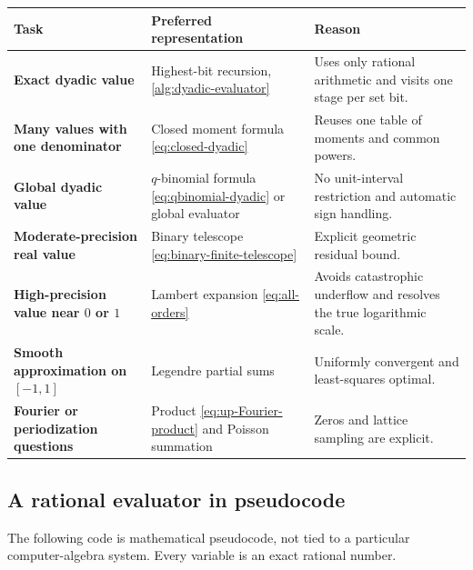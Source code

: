 \documentclass[11pt]{article}
\numberwithin{equation}{section}
\theoremstyle{definition}
\theoremstyle{remark}
\begin{document}
\begin{center}
\begin{tabularx}{\textwidth}{>{\bfseries}p{}X X}
\toprule
Task & Preferred representation & Reason\\
\midrule
Exact dyadic value & Highest-bit recursion, \cref{alg:dyadic-evaluator} &
Uses only rational arithmetic and visits one stage per set bit.\\
Many values with one denominator & Closed moment formula
\eqref{eq:closed-dyadic} & Reuses one table of moments and common powers.\\
Global dyadic value & $q$-binomial formula \eqref{eq:qbinomial-dyadic} or
global evaluator & No unit-interval restriction and automatic sign handling.\\
Moderate-precision real value & Binary telescope
\eqref{eq:binary-finite-telescope} & Explicit geometric residual bound.\\
High-precision value near $0$ or $1$ & Lambert expansion
\eqref{eq:all-orders} & Avoids catastrophic underflow and resolves the true
logarithmic scale.\\
Smooth approximation on $[-1,1]$ & Legendre partial sums & Uniformly
convergent and least-squares optimal.\\
Fourier or periodization questions & Product
\eqref{eq:up-Fourier-product} and Poisson summation & Zeros and lattice
sampling are explicit.\\
\bottomrule
\end{tabularx}
\end{center}

\subsection{A rational evaluator in pseudocode}

The following code is mathematical pseudocode, not tied to a particular
computer-algebra system.  Every variable is an exact rational number.
\end{document}
